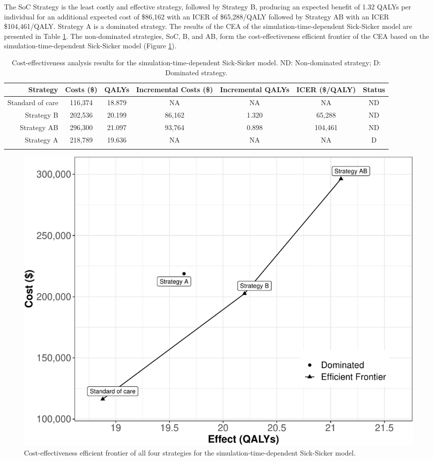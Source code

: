 \documentclass[
]{article}
\begin{document}
The SoC Strategy is the least costly and effective strategy, followed by Strategy B, producing an expected benefit of 1.32 QALYs per individual for an additional expected cost of \$86,162 with an ICER of \$65,288/QALY followed by Strategy AB with an ICER \$104,461/QALY. Strategy A is a dominated strategy. The results of the CEA of the simulation-time-dependent Sick-Sicker model are presented in Table \ref{tab:table-cea}. The non-dominated strategies, SoC, B, and AB, form the cost-effectiveness efficient frontier of the CEA based on the simulation-time-dependent Sick-Sicker model (Figure \ref{fig:Sick-Sicker-CEA-AgeDep}).

\begin{table}[!h]

\caption{\label{tab:table-cea}Cost-effectiveness analysis results for the simulation-time-dependent Sick-Sicker model. ND: Non-dominated strategy; D: Dominated strategy.}
\centering
\begin{tabular}[t]{rcccccc}
\toprule{}
Strategy & Costs (\$) & QALYs & Incremental Costs (\$) & Incremental QALYs & ICER (\$/QALY) & Status\\
\midrule{}
Standard of care & 116,374 & 18.879 & NA & NA & NA & ND\\
Strategy B & 202,536 & 20.199 & 86,162 & 1.320 & 65,288 & ND\\
Strategy AB & 296,300 & 21.097 & 93,764 & 0.898 & 104,461 & ND\\
Strategy A & 218,789 & 19.636 & NA & NA & NA & D\\
\bottomrule{}
\end{tabular}
\end{table}

\begin{figure}[H]

{\centering \includegraphics{figs/Sick-Sicker-CEA-AgeDep-1} 

}

\caption{Cost-effectiveness efficient frontier of all four strategies for the simulation-time-dependent Sick-Sicker model.}\label{fig:Sick-Sicker-CEA-AgeDep}
\end{figure}
\end{document}
